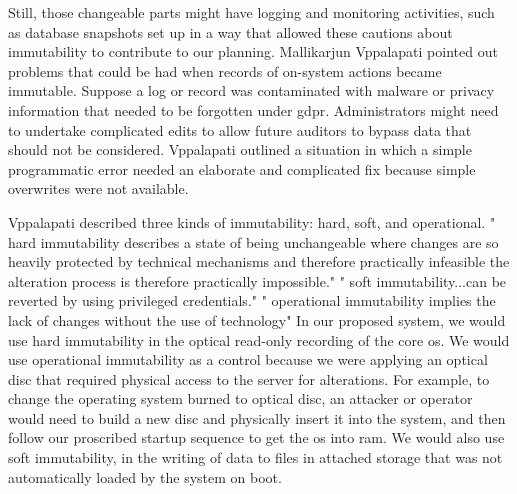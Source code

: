 Still, those changeable parts might have logging and monitoring activities, such as \gls{database} snapshots set up in a way that allowed these cautions about immutability to contribute to our planning.  Mallikarjun Vppalapati pointed out problems that could be had when records of on-system actions became immutable.  Suppose a log or record was contaminated with \gls{malware} or privacy information that needed to be forgotten under  \gls{gdpr}.  Administrators might need to undertake complicated edits to allow future auditors to bypass data that should not be considered.  Vppalapati outlined a situation in which a simple programmatic error needed an elaborate and complicated fix because simple overwrites were not available.

Vppalapati described three kinds of immutability:  hard, soft, and operational.
" \Gls{hard immutability} describes a state of being unchangeable where changes are so heavily protected by technical mechanisms
and therefore practically infeasible the alteration process is therefore practically impossible."  " \Gls{soft immutability}...can be reverted by using privileged credentials."  " \Gls{operational immutability} implies the lack of changes without the use of technology"  In our proposed system, we would use \gls{hard immutability} in the optical read-only recording of the core \gls{os}.  We would use \gls{operational immutability} as a control because we were applying an optical disc that required physical access to the server for alterations.  For example, to change the \gls{operating system} burned to optical disc, an attacker or operator would need to build a new disc and physically insert it into the system, and then follow our proscribed startup sequence to get the \gls{os} into \gls{ram}.  We would also use \gls{soft immutability}, in the writing of data to files in attached storage that was not automatically loaded by the system on boot.

